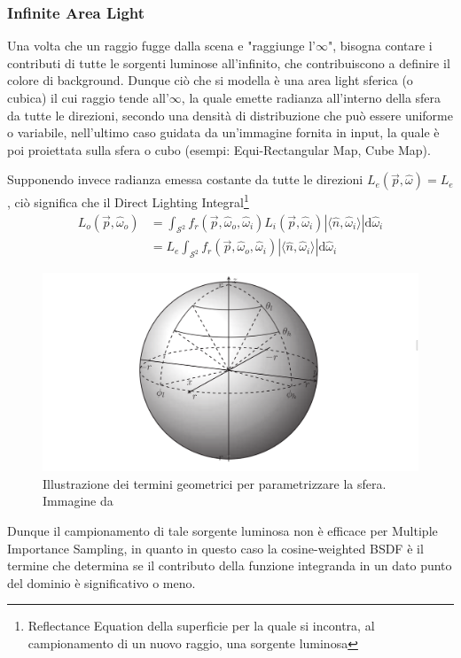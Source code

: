 \subsubsection{Infinite Area Light}
Una volta che un raggio fugge dalla scena e "raggiunge l'$\infty$", bisogna contare i contributi di tutte le sorgenti luminose all'infinito, che 
contribuiscono a definire il colore di background. Dunque ci\`o che si modella \`e una area light sferica (o cubica) il cui raggio tende all'$\infty$,
la quale emette radianza all'interno della sfera da tutte le direzioni, secondo una densit\`a di distribuzione che pu\`o essere uniforme o variabile,
nell'ultimo caso guidata da un'immagine fornita in input, la quale \`e poi proiettata sulla sfera o cubo (esempi: Equi-Rectangular Map, Cube Map).\par
Supponendo invece radianza emessa costante da tutte le direzioni $L_e(\vec{p},\hat{\omega})=L_e$, ci\`o significa che il Direct Lighting 
Integral\footnote{Reflectance Equation della superficie per la quale si incontra, al campionamento di un nuovo raggio, una sorgente luminosa}
\begin{align*}
	L_o(\vec{p},\hat{\omega}_o)&=\int_{\mathcal{S}^2}f_r(\vec{p},\hat{\omega}_o,\hat{\omega}_i)%
		L_i(\vec{p},\hat{\omega}_i)|\langle\hat{n},\hat{\omega}_i\rangle|\mathrm{d}\hat{\omega}_i \\
	&=L_e\int_{\mathcal{S}^2}f_r(\vec{p},\hat{\omega}_o,\hat{\omega}_i)|\langle\hat{n},\hat{\omega}_i\rangle|\mathrm{d}\hat{\omega}_i
\end{align*}
\begin{figure}[tb]
	\centering
	\includegraphics[width=0.6\linewidth]{../assets/chapter3_light_sphere_sampling.png}
	\caption{Illustrazione dei termini geometrici per parametrizzare la sfera. Immagine da \cite{pegoraro}}
	\label{chapter3:light:sphereSampling}
\end{figure}
Dunque il campionamento di tale sorgente luminosa non \`e efficace per Multiple Importance Sampling, in quanto in questo caso la cosine-weighted BSDF
\`e il termine che determina se il contributo della funzione integranda in un dato punto del dominio \`e significativo o meno.\par
